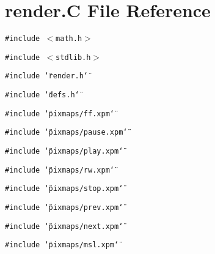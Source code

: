 \section{render.C File Reference}
\label{render_C}
{\tt \#include $<$math.h$>$}\par
{\tt \#include $<$stdlib.h$>$}\par
{\tt \#include \char`\"{}render.h\char`\"{}}\par
{\tt \#include \char`\"{}defs.h\char`\"{}}\par
{\tt \#include \char`\"{}pixmaps/ff.xpm\char`\"{}}\par
{\tt \#include \char`\"{}pixmaps/pause.xpm\char`\"{}}\par
{\tt \#include \char`\"{}pixmaps/play.xpm\char`\"{}}\par
{\tt \#include \char`\"{}pixmaps/rw.xpm\char`\"{}}\par
{\tt \#include \char`\"{}pixmaps/stop.xpm\char`\"{}}\par
{\tt \#include \char`\"{}pixmaps/prev.xpm\char`\"{}}\par
{\tt \#include \char`\"{}pixmaps/next.xpm\char`\"{}}\par
{\tt \#include \char`\"{}pixmaps/msl.xpm\char`\"{}}\par
